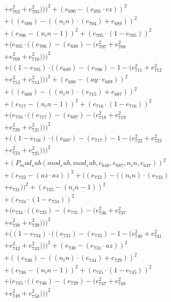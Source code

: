 \documentclass[10pt, a4paper]{article}
\begin{document}
\begin{align*}
& + e_{702}^{2} + e_{703}^{2})))^{2} + (e_{690} - (e_{691}  \cdot  cz))^{2} \\
& + ((e_{690}) - ((n_in)  \cdot  (e_{704}) + e_{689}))^{2} \\
& + (e_{706} - (n_in - 1))^{2} + (e_{705}  \cdot  (1 - e_{705}))^{2} \\
& + (e_{705}  \cdot  ((e_{706}) - (e_{689}) - (e_{707}^{2} + e_{708}^{2} \\
& + e_{709}^{2} + e_{710}^{2})))^{2} \\
& + ((1 - e_{705})  \cdot  ((e_{689}) - (e_{706}) - 1 - (e_{711}^{2} + e_{712}^{2} \\
& + e_{713}^{2} + e_{714}^{2})))^{2} + (e_{688} - (ay  \cdot  e_{689}))^{2} \\
& + ((e_{688}) - ((n_in)  \cdot  (e_{715}) + e_{687}))^{2} \\
& + (e_{717} - (n_in - 1))^{2} + (e_{716}  \cdot  (1 - e_{716}))^{2} \\
& + (e_{716}  \cdot  ((e_{717}) - (e_{687}) - (e_{718}^{2} + e_{719}^{2} \\
& + e_{720}^{2} + e_{721}^{2})))^{2} \\
& + ((1 - e_{716})  \cdot  ((e_{687}) - (e_{717}) - 1 - (e_{722}^{2} + e_{723}^{2} \\
& + e_{724}^{2} + e_{725}^{2})))^{2} \\
& + (P_mod_sub(mod_sub, mod_sub, e_{648}, e_{687}, n_in, e_{647}))^{2} \\
& + (e_{732} - (az  \cdot  az))^{2} + ((e_{732}) - ((n_in)  \cdot  (e_{733}) \\
& + e_{731}))^{2} + (e_{735} - (n_in - 1))^{2} \\
& + (e_{734}  \cdot  (1 - e_{734}))^{2} \\
& + (e_{734}  \cdot  ((e_{735}) - (e_{731}) - (e_{736}^{2} + e_{737}^{2} \\
& + e_{738}^{2} + e_{739}^{2})))^{2} \\
& + ((1 - e_{734})  \cdot  ((e_{731}) - (e_{735}) - 1 - (e_{740}^{2} + e_{741}^{2} \\
& + e_{742}^{2} + e_{743}^{2})))^{2} + (e_{730} - (e_{731}  \cdot  az))^{2} \\
& + ((e_{730}) - ((n_in)  \cdot  (e_{744}) + e_{729}))^{2} \\
& + (e_{746} - (n_in - 1))^{2} + (e_{745}  \cdot  (1 - e_{745}))^{2} \\
& + (e_{745}  \cdot  ((e_{746}) - (e_{729}) - (e_{747}^{2} + e_{748}^{2} \\
& + e_{749}^{2} + e_{750}^{2})))^{2} \\

\end{align*}
\end{document}
